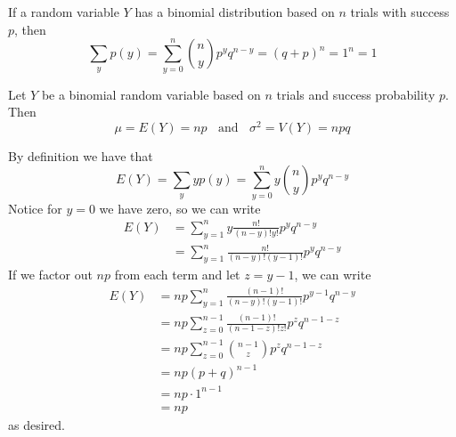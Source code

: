 \documentclass[12pt, a4paper, twoside, openright, titlepage]{book}
\begin{document}
\begin{cor}{}{}
    If a random variable $Y$ has a binomial distribution based on $n$ trials with success $p$, then \begin{equation*}
        \sum\limits_y p(y) = \sum\limits_{y=0}^n\binom{n}{y}p^yq^{n-y} = (q+p)^n = 1^n = 1
    \end{equation*}
\end{cor}


\begin{thm}{}{}
    Let $Y$ be a binomial random variable based on $n$ trials and success probability $p$. Then \begin{equation*}
        \mu = E(Y) = np\;\;\text{ and }\;\;\sigma^2 = V(Y) = npq
    \end{equation*}
\end{thm}
\begin{proof*}{}{}
    By definition we have that \begin{equation*}
        E(Y) = \sum\limits_y yp(y) = \sum\limits_{y=0}^ny\binom{n}{y}p^yq^{n-y}
    \end{equation*}
    Notice for $y = 0$ we have zero, so we can write \begin{align*}
        E(Y) &= \sum\limits_{y=1}^ny\frac{n!}{(n-y)!y!}p^yq^{n-y} \\
        &= \sum\limits_{y=1}^n\frac{n!}{(n-y)!(y-1)!}p^yq^{n-y}
    \end{align*}
    If we factor out $np$ from each term and let $z = y-1$, we can write \begin{align*}
        E(Y) &= np\sum\limits_{y=1}^n\frac{(n-1)!}{(n-y)!(y-1)!}p^{y-1}q^{n-y} \\
        &= np\sum\limits_{z=0}^{n-1}\frac{(n-1)!}{(n-1-z)!z!}p^zq^{n-1-z} \\
        &= np\sum\limits_{z=0}^{n-1}\binom{n-1}{z}p^zq^{n-1-z} \\
        &= np(p+q)^{n-1} \\
        &= np\cdot 1^{n-1} \\
        &= np
    \end{align*}
    as desired.


\end{proof*}
\end{document}
